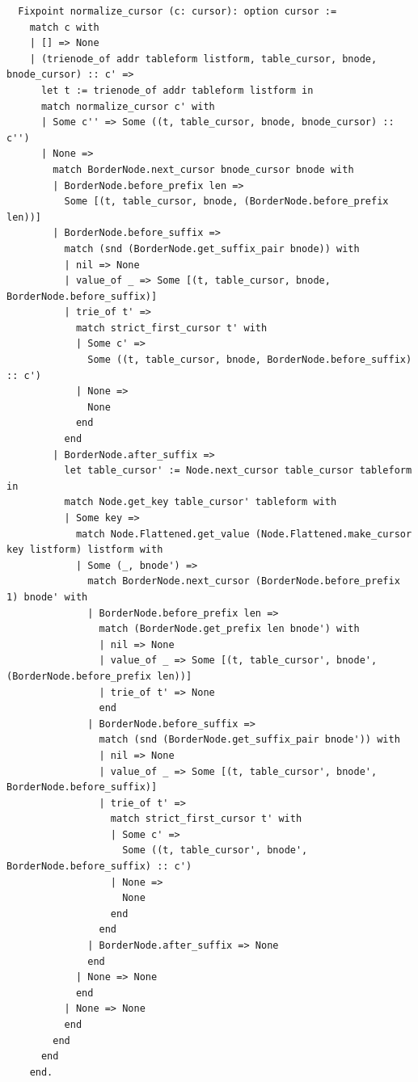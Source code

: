 \documentclass[runningheads]{llncs}
\begin{document}
\begin{verbatim}
  Fixpoint normalize_cursor (c: cursor): option cursor :=
    match c with
    | [] => None
    | (trienode_of addr tableform listform, table_cursor, bnode, bnode_cursor) :: c' =>
      let t := trienode_of addr tableform listform in
      match normalize_cursor c' with
      | Some c'' => Some ((t, table_cursor, bnode, bnode_cursor) :: c'')
      | None =>
        match BorderNode.next_cursor bnode_cursor bnode with
        | BorderNode.before_prefix len =>
          Some [(t, table_cursor, bnode, (BorderNode.before_prefix len))]
        | BorderNode.before_suffix =>
          match (snd (BorderNode.get_suffix_pair bnode)) with
          | nil => None
          | value_of _ => Some [(t, table_cursor, bnode, BorderNode.before_suffix)]
          | trie_of t' =>
            match strict_first_cursor t' with
            | Some c' =>
              Some ((t, table_cursor, bnode, BorderNode.before_suffix) :: c')
            | None =>
              None
            end
          end
        | BorderNode.after_suffix =>
          let table_cursor' := Node.next_cursor table_cursor tableform in
          match Node.get_key table_cursor' tableform with
          | Some key =>
            match Node.Flattened.get_value (Node.Flattened.make_cursor key listform) listform with
            | Some (_, bnode') =>
              match BorderNode.next_cursor (BorderNode.before_prefix 1) bnode' with
              | BorderNode.before_prefix len =>
                match (BorderNode.get_prefix len bnode') with
                | nil => None
                | value_of _ => Some [(t, table_cursor', bnode', (BorderNode.before_prefix len))]
                | trie_of t' => None
                end
              | BorderNode.before_suffix =>
                match (snd (BorderNode.get_suffix_pair bnode')) with
                | nil => None
                | value_of _ => Some [(t, table_cursor', bnode', BorderNode.before_suffix)]
                | trie_of t' =>
                  match strict_first_cursor t' with
                  | Some c' =>
                    Some ((t, table_cursor', bnode', BorderNode.before_suffix) :: c')
                  | None =>
                    None
                  end
                end
              | BorderNode.after_suffix => None
              end
            | None => None
            end
          | None => None
          end
        end
      end
    end.


\end{verbatim}
\end{document}
